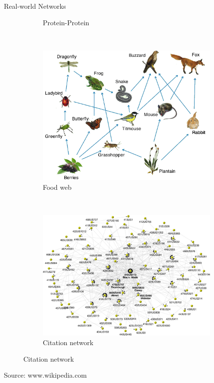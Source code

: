 \documentclass{beamer}
\begin{document}
\begin{frame}{Real-world Networks}
\begin{figure}[!h]
\begin{subfigure}[b]{0.3\textwidth}
			\caption{Protein-Protein }
		\end{subfigure}\\
		\begin{subfigure}[b]{0.3\textwidth}
			\includegraphics[width=\textwidth]{images/food-web-2.png}
			\caption{Food web}
		\end{subfigure}~
		\begin{subfigure}[b]{0.3\textwidth}
			\includegraphics[width= \textwidth]{images/citation.jpg}
			\caption{Citation network}
		\end{subfigure}
	\end{figure}
Source: www.wikipedia.com
\end{frame}
\end{document}
